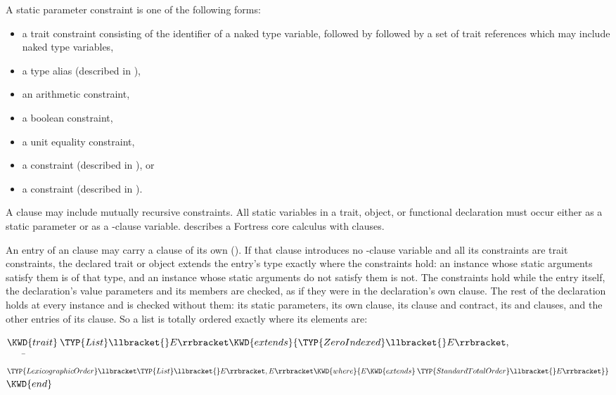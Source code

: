 A static parameter constraint is one of the following forms:
\begin{itemize}
\item a trait constraint consisting of the identifier of
a naked type variable, followed by 
followed by a set of trait references which may include naked type variables,
\item a type alias (described in ),
\item an arithmetic constraint,
\item a boolean constraint,
\item a unit equality constraint,
\item a  constraint (described in
  ), or
\item a  constraint (described in
  ).
\end{itemize}
A  clause may include mutually recursive constraints.
All static variables in a trait, object, or functional declaration must
occur either as a static parameter or as a -clause variable.
 describes a Fortress core calculus with
 clauses.

An entry of an  clause may carry a  clause of its
own ().
If that clause introduces no -clause variable and all its
constraints are trait constraints, the declared trait or object extends the
entry's type exactly where the constraints hold:
an instance whose static arguments satisfy them is of that type,
and an instance whose static arguments do not satisfy them is not.
The constraints hold while the entry itself, the declaration's value
parameters and its members are checked, as if they were in the
declaration's own  clause.
The rest of the declaration holds at every instance and is checked
without them: its static parameters, its own  clause, its
 clause and contract, its  and 
clauses, and the other entries of its  clause.
So a list is totally ordered exactly where its elements are:
\begin{Fortress}
\(\KWD{trait}\:\TYP{List}\llbracket{}E\rrbracket \KWD{extends} \{\TYP{ZeroIndexed}\llbracket{}E\rrbracket,\)\\
{\tt~~~~}\pushtabs\=\+\(    \TYP{LexicographicOrder}\llbracket\TYP{List}\llbracket{}E\rrbracket,E\rrbracket \KWD{where} \{E \KWD{extends}\:\TYP{StandardTotalOrder}\llbracket{}E\rrbracket\}\}\)\-\\\poptabs
\(\KWD{end}\)
\end{Fortress}

